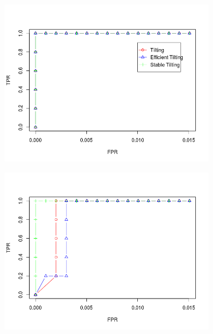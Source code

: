 \documentclass[11pt]{report}\usepackage[utf8]{inputenc}
\begin{document}
\begin{figure}[h]
    \centering
    \begin{subfigure}[b]{0.3\textwidth}
        \includegraphics[width=\textwidth]{../plots/500t08}
        \caption{}
    \end{subfigure}
    \begin{subfigure}[b]{0.3\textwidth}
        \includegraphics[width=\textwidth]{../plots/500t06}
        \caption{}
    \end{subfigure}
    \begin{subfigure}[b]{0.3\textwidth}

\end{subfigure}
\end{figure}
\end{document}

